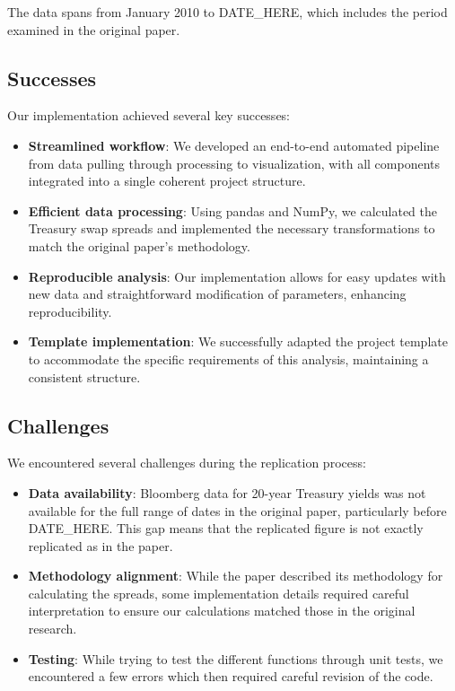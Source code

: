 \documentclass[12pt]{article}
\begin{document}
The data spans from January 2010 to DATE_HERE, which includes the period examined in the original paper.

\subsection{Successes}

Our implementation achieved several key successes:

\begin{itemize}
    \item \textbf{Streamlined workflow}: We developed an end-to-end automated pipeline from data pulling through processing to visualization, with all components integrated into a single coherent project structure.
    
    \item \textbf{Efficient data processing}: Using pandas and NumPy, we calculated the Treasury swap spreads and implemented the necessary transformations to match the original paper's methodology.
    
    \item \textbf{Reproducible analysis}: Our implementation allows for easy updates with new data and straightforward modification of parameters, enhancing reproducibility.
    
    \item \textbf{Template implementation}: We successfully adapted the project template to accommodate the specific requirements of this analysis, maintaining a consistent structure.
\end{itemize}

\subsection{Challenges}

We encountered several challenges during the replication process:

\begin{itemize}
    \item \textbf{Data availability}: Bloomberg data for 20-year Treasury yields was not available for the full range of dates in the original paper, particularly before DATE_HERE. This gap means that the replicated figure is not exactly replicated as in the paper.
    
    \item \textbf{Methodology alignment}: While the paper described its methodology for calculating the spreads, some implementation details required careful interpretation to ensure our calculations matched those in the original research.
    
    \item \textbf{Testing}: While trying to test the different functions through unit tests, we encountered a few errors which then required careful revision of the code.
\end{itemize}
\end{document}
